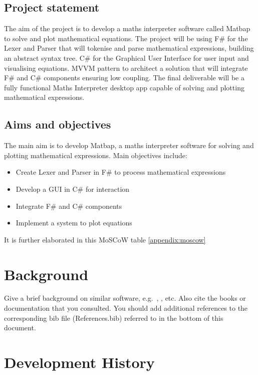 \documentclass[a4paper, oneside, 11pt]{report}
\begin{document}
\section{Project statement}
The aim of the project is to develop a maths interpreter software called Matbap to solve and plot mathematical equations. The project will be using F\# for the Lexer and Parser that will tokenise and parse mathematical expressions, building an abstract syntax tree. C\# for the Graphical User Interface for user input and visualising equations. MVVM pattern to architect a solution that will integrate F\# and C\# components ensuring low coupling. The final deliverable will be a fully functional Maths Interpreter desktop app capable of solving and plotting mathematical expressions.

\section{Aims and objectives}
The main aim is to develop Matbap, a maths interpreter software for solving and plotting mathematical expressions. Main objectives include:
\begin{itemize}
    \item Create Lexer and Parser in F\# to process mathematical expressions
    \item Develop a GUI in C\# for interaction
    \item Integrate F\# and C\# components
    \item Implement a system to plot equations
\end{itemize}

\noindent %
It is further elaborated in this MoSCoW table \ref{appendix:moscow} 






\chapter{Background}

Give a brief background on similar software, e.g.\ \cite{Desmos:2023}, \cite{Matlab:2023}, etc.
Also cite the books \cite{Nystrom:2021} or documentation \cite{WPF:2023} that you consulted.
You should add additional references to the corresponding bib file (References.bib) referred to in the bottom of this document.


\chapter{Development History}\label{Chap:DevHist}
\end{document}
